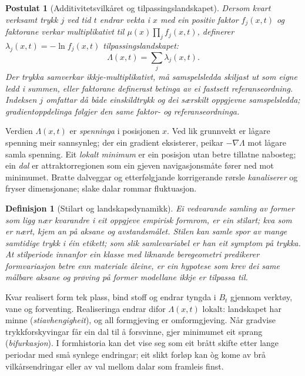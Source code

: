\documentclass[9pt,twocolumn,a4paper]{article}
\theoremstyle{defstyle}
\newtheorem{definisjon}{Definisjon}
\newtheorem{postulat}{Postulat}
\theoremstyle{formstyle}
\begin{document}
\begin{postulat}[Additivitetsvilkåret og tilpassingslandskapet]
Dersom kvart verksamt trykk $j$ ved tid $t$ endrar vekta i $x$ med ein positiv faktor $f_j(x, t)$ og faktorane verkar multiplikativt til $\mu(x)\prod_j f_j(x, t)$, definerer $\lambda_j(x, t) = -\ln f_j(x, t)$ \emph{tilpassingslandskapet}:
\begin{equation}
\Lambda(x, t) = \sum_j \lambda_j(x, t).
\end{equation}
Der trykka samverkar ikkje-multiplikativt, må samspelsledda skiljast ut som eigne ledd i summen, eller faktorane definerast betinga av ei fastsett referanseordning. Indeksen $j$ omfattar då både einskildtrykk og dei særskilt oppgjevne samspelsledda; gradientoppdelinga følgjer den same faktor- og referanseordninga.
\end{postulat}

Verdien $\Lambda(x, t)$ er \emph{spenninga} i posisjonen $x$. Ved lik grunnvekt er lågare spenning meir sannsynleg; der ein gradient eksisterer, peikar $-\nabla\Lambda$ mot lågare samla spenning. Eit \emph{lokalt minimum} er ein posisjon utan betre tillatne nabosteg; ein \emph{dal} er attraktorregionen som ein gjeven navigasjonsmåte fører ned mot minimumet. Bratte dalveggar og etterfølgjande korrigerande rørsle \emph{kanaliserer} og fryser dimensjonane; slake dalar rommar fluktuasjon.

\begin{definisjon}[Stilart og landskapsdynamikk]
Ei vedvarande samling av former som ligg nær kvarandre i eit oppgjeve empirisk formrom, er ein \emph{stilart}; kva som er nært, kjem an på aksane og avstandsmålet. Stilen kan samle spor av mange samtidige trykk i éin etikett; som slik samlevariabel er han eit symptom på trykka. At stilperiode innanfor ein klasse med liknande beregeometri predikerer formvariasjon betre enn materiale åleine, er ein hypotese som krev dei same målbare aksane og prøving på former modellane ikkje er tilpassa til.
\end{definisjon}

Kvar realisert form tek plass, bind stoff og endrar tyngda i $B_t$ gjennom verktøy, vane og forventing. Realiseringa endrar difor $\Lambda(x, t)$ lokalt: landskapet har minne (\emph{stiavhengigheit}), og all formgjeving er omformgjeving. Når gradvise trykkforskyvingar får ein dal til å forsvinne, gjer minimumet eit sprang (\emph{bifurkasjon}). I formhistoria kan det vise seg som eit brått skifte etter lange periodar med små synlege endringar; eit slikt forløp kan òg kome av brå vilkårsendringar eller av val mellom dalar som framleis finst.
\end{document}
